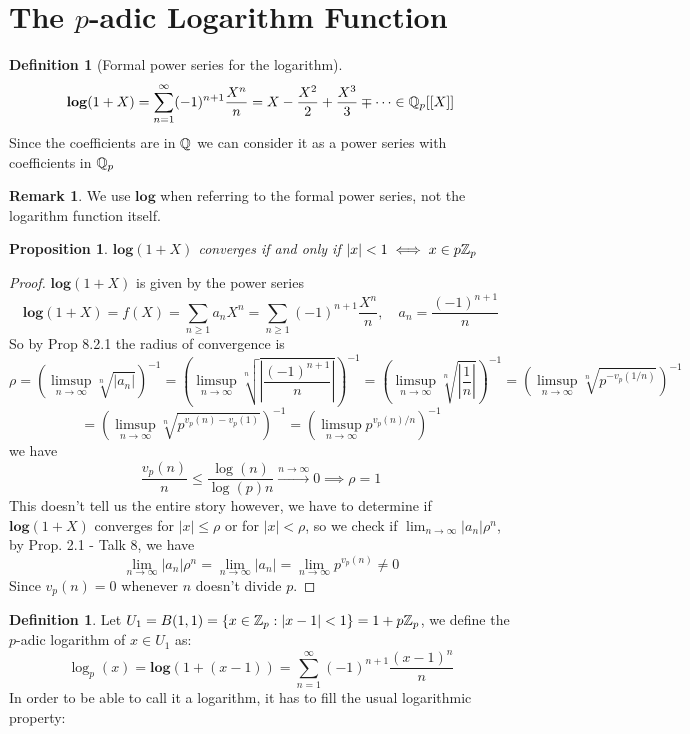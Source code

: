 \documentclass[a4paper]{article}
\theoremstyle{plain}
\newtheorem{prop}[thm]{Proposition}
\theoremstyle{definition}
\newtheorem{defi}[thm]{Definition}
\newtheorem{rem}[thm]{Remark}
\begin{document}
\section{The $p$-adic Logarithm Function}
\begin{defi}[Formal power series for the logarithm]
  $$\mathbf{log}(1+X) = \sum_{n=1}^{\infty} (-1)^{n+1}\frac {X^{n}}{n} = X - \frac{X^{2}}{2} + \frac{X^{3}}{3} \mp \cdots \in \Bbb Q_{p}[[X]]$$
  Since the coefficients are in $\Bbb Q$ we can consider it as a power series with coefficients in $\Bbb Q_{p}$
\end{defi}
\begin{rem}
We use $\mathbf{log}$ when referring to the formal power series, not the logarithm function itself.
\end{rem}
\begin{prop} $\mathbf{log}(1+X)$ converges if and only if $|x| < 1 \iff x \in p\Bbb Z_{p}$
\end{prop}
\begin{proof}
  $\mathbf{log}(1+X)$ is given by the power series
  $$\mathbf{log}(1+X) = f(X) = \sum_{n \geq 1}a_{n}X^{n} = \sum_{n\geq1} (-1)^{n+1}\frac {X^{n}}{n}, \quad a_{n} = \frac {(-1)^{n+1}}n $$
  So by Prop 8.2.1 the radius of convergence is
  $$\rho = \left(\limsup_{n \to \infty} \sqrt[n]{|a_{n}|}\right)^{-1} = \left(\limsup_{n \to \infty} \sqrt[n]{\left|\frac {(-1)^{n+1}}n\right|}\right)^{-1} = \left(\limsup_{n \to \infty} \sqrt[n]{\left| \frac 1n\right|}\right)^{-1} = \left(\limsup_{n \to \infty} \sqrt[n]{p^{-v_{p}(1/n)}}\right)^{-1}$$
  $$ = \left(\limsup_{n \to \infty} \sqrt[n]{p^{v_{p}(n) - v_{p}(1)}}\right)^{-1} = \left( \limsup_{n \to \infty} p^{v_{p}(n) / n} \right)^{-1}$$
  we have
  $$\frac{v_{p}(n)}{n} \leq \frac{\log(n)}{\log(p)n} \xrightarrow{n \to \infty} 0 \implies \rho = 1$$
  This doesn't tell us the entire story however, we have to determine if $\mathbf{log}(1+X)$ converges for $|x| \leq \rho$ or for $|x| < \rho$, so we check if $\lim_{n \to \infty}|a_{n}|\rho^{n}$, by Prop. 2.1 - Talk 8, we have
  $$\lim_{n \to \infty}|a_{n}|\rho^{n} = \lim_{n \to \infty}|a_{n}| = \lim_{n \to \infty}p^{v_{p}(n)} \neq 0$$
  Since $v_{p}(n) = 0$ whenever $n$ doesn't divide $p$.
\end{proof}
\begin{defi}Let $U_{1} = B(1,1) = \{x \in \Bbb Z_{p} : |x-1| < 1\} = 1+p\Bbb Z_{p}$, we define the $p$-adic logarithm of $x \in U_{1}$ as:
  $$\log_{p}(x) = \mathbf{log}(1+(x-1)) = \sum_{n=1}^{\infty} (-1)^{n+1}\frac {(x-1)^{n}}{n}$$
  In order to be able to call it a logarithm, it has to fill the usual logarithmic property:
\end{defi}
\end{document}
